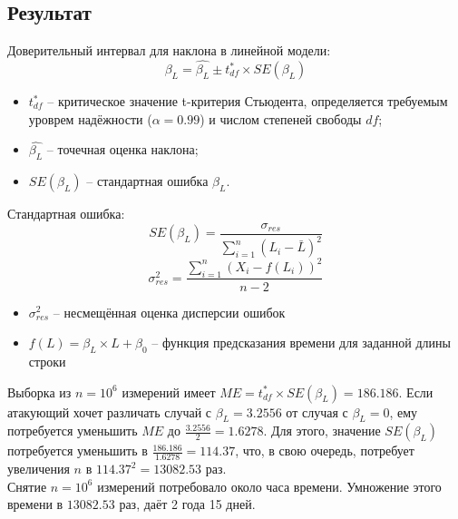 \subsection{Результат}

Доверительный интервал для наклона в линейной модели:
\begin{equation}
\beta_L = \hat{\beta_L} \pm t^{*}_{df} \times SE(\beta_L)
\end{equation}
\begin{itemize}
\item $t^{*}_{df}$ -- критическое значение t-критерия Стьюдента, определяется
     требуемым уроврем надёжности ($\alpha = 0.99$) и числом степеней свободы $df$;
\item $\hat{\beta_L}$ -- точечная оценка наклона;
\item $SE(\beta_L)$ -- стандартная ошибка $\beta_L$.
\end{itemize}

Стандартная ошибка: \\
\begin{equation}
SE(\beta_L) = \frac{ \sigma_{res} }{ \sum^n_{i=1} (L_i - \bar{L})^2 }
\end{equation}
\begin{equation}
\sigma_{res}^2 = \frac{ \sum^n_{i=1}  (X_i - f(L_i))^2 }{ n - 2 }
\end{equation}
\begin{itemize}
\item $\sigma_{res}^2$ -- несмещённая оценка дисперсии ошибок \\
\item $f(L) = \beta_{L} \times L + \beta_0$ -- функция предсказания времени для заданной длины строки \\
\end{itemize}

Выборка из $n = 10^6$ измерений имеет $ME = t^{*}_{df} \times SE(\beta_L) = 186.186$.
Если атакующий хочет различать случай с $\beta_L = 3.2556$ от случая с $\beta_L = 0$,
ему потребуется уменьшить $ME$ до $\frac{3.2556}{2} = 1.6278$. Для этого,
значение $SE(\beta_L)$ потребуется уменьшить в $\frac{186.186}{1.6278} = 114.37$,
что, в свою очередь, потребует увеличения $n$ в $114.37^2 = 13082.53$ раз.
\\[0.5cm]
Снятие $n = 10^6$ измерений потребовало около часа времени. Умножение этого времени в $13082.53$
раз, даёт 2 года 15 дней.

\clearpage
